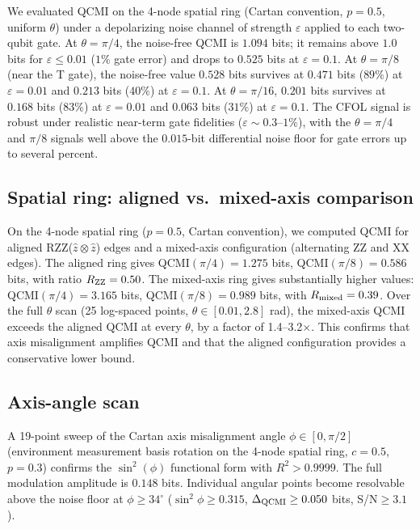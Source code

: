 \documentclass[aps,prl,showpacs]{revtex4-2}
\begin{document}
We evaluated QCMI on the 4-node spatial ring (Cartan convention, $p=0.5$, uniform $\theta$) under a depolarizing noise channel of strength $\varepsilon$ applied to each two-qubit gate. At $\theta=\pi/4$, the noise-free QCMI is $1.094$ bits; it remains above $1.0$ bits for $\varepsilon\leq0.01$ ($1\%$ gate error) and drops to $0.525$ bits at $\varepsilon=0.1$. At $\theta=\pi/8$ (near the T gate), the noise-free value $0.528$ bits survives at $0.471$ bits ($89\%$) at $\varepsilon=0.01$ and $0.213$ bits ($40\%$) at $\varepsilon=0.1$. At $\theta=\pi/16$, $0.201$ bits survives at $0.168$ bits ($83\%$) at $\varepsilon=0.01$ and $0.063$ bits ($31\%$) at $\varepsilon=0.1$. The CFOL signal is robust under realistic near-term gate fidelities ($\varepsilon\sim0.3$--$1\%$), with the $\theta=\pi/4$ and $\pi/8$ signals well above the $0.015$-bit differential noise floor for gate errors up to several percent.

\subsection{Spatial ring: aligned vs.\ mixed-axis comparison}

On the 4-node spatial ring ($p=0.5$, Cartan convention), we computed QCMI for aligned RZZ($\hat{z}\otimes\hat{z}$) edges and a mixed-axis configuration (alternating ZZ and XX edges). The aligned ring gives QCMI$(\pi/4)=1.275$ bits, QCMI$(\pi/8)=0.586$ bits, with ratio $R_{\rm ZZ}=0.50$. The mixed-axis ring gives substantially higher values: QCMI$(\pi/4)=3.165$ bits, QCMI$(\pi/8)=0.989$ bits, with $R_{\rm mixed}=0.39$. Over the full $\theta$ scan (25 log-spaced points, $\theta\in[0.01,2.8]$ rad), the mixed-axis QCMI exceeds the aligned QCMI at every $\theta$, by a factor of 1.4--3.2$\times$. This confirms that axis misalignment amplifies QCMI and that the aligned configuration provides a conservative lower bound.

\subsection{Axis-angle scan}

A 19-point sweep of the Cartan axis misalignment angle $\phi\in[0,\pi/2]$ (environment measurement basis rotation on the 4-node spatial ring, $c=0.5$, $p=0.3$) confirms the $\sin^2(\phi)$ functional form with $R^2>0.9999$. The full modulation amplitude is $0.148$ bits. Individual angular points become resolvable above the noise floor at $\phi\geq34^\circ$ ($\sin^2\phi\geq0.315$, $\Delta_{\rm QCMI}\geq0.050$ bits, S/N$\geq3.1$).
\end{document}
